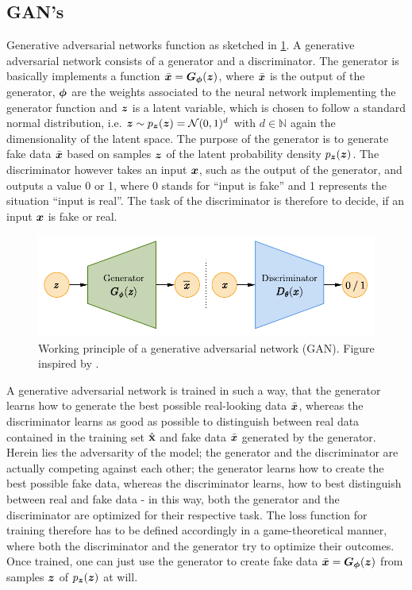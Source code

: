 \documentclass[a4paper,12pt]{report}
\begin{document}
\subsection{GAN's}
Generative adversarial networks function as sketched in \cref{fig:GAN}. A generative adversarial network consists of a generator and a discriminator. The generator is basically implements a function $\bar{\bm{x}} = \bm{G}_{\bm{\phi}}(\bm{z})$, where $\bar{\bm{x}}$ is the output of the generator, $\bm{\phi}$ are the weights associated to the neural network implementing the generator function and $\bm{z}$ is a latent variable, which is chosen to follow a standard normal distribution, i.e. $\bm{z} \sim p_{\bm{z}}(\bm{z}) = \mathcal{N}(0,1)^d$ with $d \in \mathbb{N}$ again the dimensionality of the latent space. The purpose of the generator is to generate fake data $\bar{\bm{x}}$ based on samples $\bm{z}$ of the latent probability density $p_{\bm{z}}(\bm{z})$. The discriminator however takes an input $\bm{x}$, such as the output of the generator, and outputs a value 0 or 1, where 0 stands for ``input is fake'' and 1 represents the situation ``input is real''. The task of the discriminator is therefore to decide, if an input $\bm{x}$ is fake or real.
\begin{figure}[h!]
\centering
\includegraphics[width=\linewidth-4cm]{figures/GAN.pdf}
\caption{Working principle of a generative adversarial network (GAN). Figure inspired by \cite{weng2018flow}.}
\label{fig:GAN}
\end{figure}

A generative adversarial network is trained in such a way, that the generator learns how to generate the best possible real-looking data $\bar{\bm{x}}$, whereas the discriminator learns as good as possible to distinguish between real data contained in the training set $\hat{\boldsymbol{\mathbf{x}}}$ and fake data $\bar{\bm{x}}$ generated by the generator. Herein lies the adversarity of the model; the generator and the discriminator are actually competing against each other; the generator learns how to create the best possible fake data, whereas the discriminator learns, how to best distinguish between real and fake data - in this way, both the generator and the discriminator are optimized for their respective task. The loss function for training therefore has to be defined accordingly in a game-theoretical manner, where both the discriminator and the generator try to optimize their outcomes. Once trained, one can just use the generator to create fake data $\bar{\bm{x}} = \bm{G}_{\bm{\phi}}(\bm{z})$ from samples $\bm{z}$ of $p_{\bm{z}}(\bm{z})$ at will.
\end{document}
